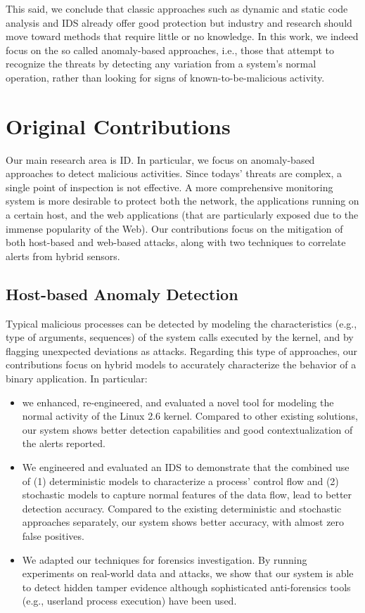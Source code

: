 This said, we conclude that classic approaches such as dynamic and static code analysis and \ac{IDS} already offer good protection but industry and research should move toward methods that require little or no knowledge. In this work, we indeed focus on the so called anomaly-based approaches, i.e., those that attempt to recognize the threats by detecting any variation from a system's normal operation, rather than looking for signs of known-to-be-malicious activity.

\section{Original Contributions}
\label{introduction:contributions} Our main research area is \ac{ID}. In particular, we focus on anomaly-based approaches to detect malicious activities. Since todays' threats are complex, a single point of inspection is not effective. A more comprehensive monitoring system is more desirable to protect both the network, the applications running on a certain host, and the web applications (that are particularly exposed due to the immense popularity of the Web). Our contributions focus on the mitigation of both host-based and web-based attacks, along with two techniques to correlate alerts from hybrid sensors.

\subsection{Host-based Anomaly Detection} Typical malicious processes can be detected by modeling the characteristics (e.g., type of arguments, sequences) of the system calls executed by the kernel, and by flagging unexpected deviations as attacks. Regarding this type of approaches, our contributions focus on hybrid models to accurately characterize the behavior of a binary application. In particular:

\begin{itemize}
\item we enhanced, re-engineered, and evaluated a novel tool for modeling the normal activity of the Linux 2.6 kernel. Compared to other existing solutions, our system shows better detection capabilities and good contextualization of the alerts reported.
\item We engineered and evaluated an \ac{IDS} to demonstrate that the combined use of (1) deterministic models to characterize a process' control flow and (2) stochastic models to capture normal features of the data flow, lead to better detection accuracy. Compared to the existing deterministic and stochastic approaches separately, our system shows better accuracy, with almost zero false positives.
\item We adapted our techniques for forensics investigation. By running experiments on real-world data and attacks, we show that our system is able to detect hidden tamper evidence although sophisticated anti-forensics tools (e.g., userland process execution) have been used.
\end{itemize}

